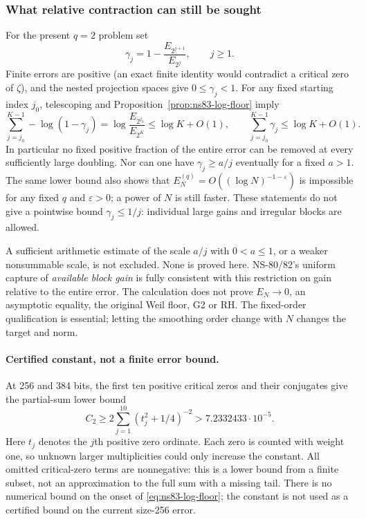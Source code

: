 \documentclass[11pt]{article}
\theoremstyle{remark}
\begin{document}
\subsubsection{What relative contraction can still be sought}
For the present $q=2$ problem set
\[
 \gamma_j=1-\frac{E_{2^{j+1}}}{E_{2^j}},\qquad j\geq1.
\]
Finite errors are positive (an exact finite identity would contradict a
critical zero of $\zeta$), and the nested projection spaces give
$0\leq\gamma_j<1$. For any fixed starting index $j_0$, telescoping and
Proposition~\ref{prop:ns83-log-floor} imply
\begin{equation}
 \sum_{j=j_0}^{K-1}-\log(1-\gamma_j)
 =\log\frac{E_{2^{j_0}}}{E_{2^K}}
 \leq\log K+O(1),\qquad
 \sum_{j=j_0}^{K-1}\gamma_j\leq\log K+O(1).
 \label{eq:ns83-gain-budget}
\end{equation}
In particular no fixed positive fraction of the entire error can be
removed at every sufficiently large doubling. Nor can one have
$\gamma_j\geq a/j$ eventually for a fixed $a>1$.
The same lower bound also shows that $E_N^{(q)}=O((\log N)^{-1-\varepsilon})$ is impossible
for any fixed $q$ and $\varepsilon>0$; a power of $N$ is still faster.
These statements do not give a pointwise bound $\gamma_j\leq1/j$:
individual large gains and irregular blocks are allowed.

A sufficient arithmetic estimate of the scale $a/j$ with $0<a\leq1$,
or a weaker nonsummable scale, is not excluded. None is proved here.
NS-80/82's uniform capture of \emph{available block gain} is fully
consistent with this restriction on gain relative to the entire error.
The calculation does not prove $E_N\to0$, an asymptotic equality, the
original Weil floor, G2 or RH. The fixed-order qualification is essential;
letting the smoothing order change with $N$ changes the target and norm.

\paragraph{Certified constant, not a finite error bound.}
At 256 and 384 bits, the first ten positive critical zeros and their
conjugates give the partial-sum lower bound
\[
 C_2\geq2\sum_{j=1}^{10}(t_j^2+1/4)^{-2}
 >7.2332433\cdot10^{-5}.
\]
Here $t_j$ denotes the $j$th positive zero ordinate. Each zero is
counted with weight one, so unknown
larger multiplicities could only increase the constant. All omitted
critical-zero terms are nonnegative: this is a lower bound from a finite
subset, not an approximation to the full sum with a missing tail.
There is no numerical bound on the onset of
\eqref{eq:ns83-log-floor}; the constant is not used as a certified bound
on the current size-256 error.
\end{document}
